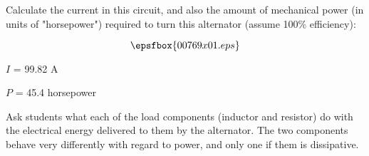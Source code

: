 

Calculate the current in this circuit, and also the amount of mechanical power (in units of "horsepower") required to turn this alternator (assume 100\% efficiency):

$$\epsfbox{00769x01.eps}$$







$I$ = 99.82 A

$P$ = 45.4 horsepower







Ask students what each of the load components (inductor and resistor) do with the electrical energy delivered to them by the alternator.  The two components behave very differently with regard to power, and only one if them is dissipative.




